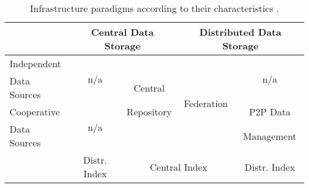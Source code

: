 

\begin{table}[htbp]
  \caption{Infrastructure paradigms according to their characteristics \citep{gorlitz_federated_2011}.}
  \begin{center}
    \begin{tabular}{l|c|c|c|c|}
      \cline{2-5}
      ~ & \multicolumn{2}{c|}{Central Data Storage} & \multicolumn{2}{c|}{Distributed Data Storage} \\
      \hline
      \multicolumn{1}{|l|}{Independent} & \multirow{2}{*}{n/a} & ~ & \multirow{4}{*}{Federation} & \multirow{2}{*}{n/a} \\
      \multicolumn{1}{|l|}{Data Sources} & ~ & Central &~ & ~ \\
      \cline{1-2} \cline{5-5}
      \multicolumn{1}{|l|}{Cooperative} & \multirow{2}{*}{n/a} & Repository & ~ & P2P Data \\
      \multicolumn{1}{|l|}{Data Sources} & ~ & ~ & ~ & Management \\
      \hline
      ~ & Distr. Index & \multicolumn{2}{|c|}{Central Index} & Distr. Index \\
      \cline{2-5}
    \end{tabular}
  \end{center}
  \label{tab:infrastructure_lod}
\end{table}